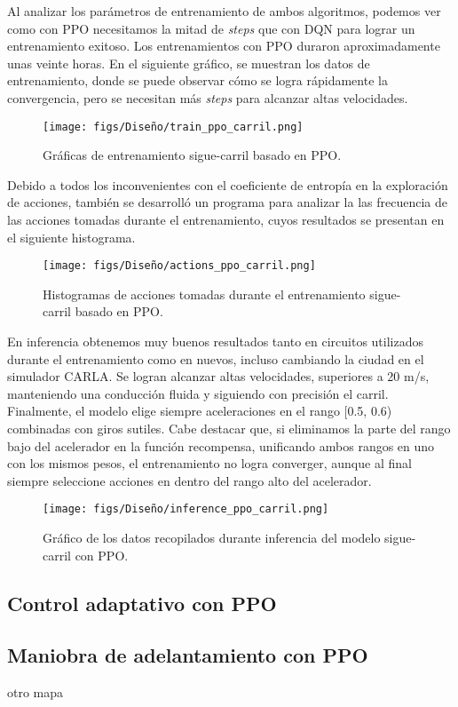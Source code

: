 Al analizar los parámetros de entrenamiento de ambos algoritmos, podemos ver como con \ac{PPO} necesitamos la mitad de \textit{steps} que con \ac{DQN} para lograr un entrenamiento exitoso. Los entrenamientos con \ac{PPO} duraron aproximadamente unas veinte horas. En el siguiente gráfico, se muestran los datos de entrenamiento, donde se puede observar cómo se logra rápidamente la convergencia, pero se necesitan más \textit{steps} para alcanzar altas velocidades.
\begin{figure}[ht]
  \centering
  \texttt{[image: figs/Diseño/train\_ppo\_carril.png]}
  \caption{Gráficas de entrenamiento sigue-carril basado en \ac{PPO}.}
  \label{fig:train_ppo_carril}
\end{figure}

Debido a todos los inconvenientes con el coeficiente de entropía en  la exploración de acciones, también se desarrolló un programa para analizar la las frecuencia de las acciones tomadas durante el entrenamiento, cuyos resultados se presentan en el siguiente histograma.
\begin{figure}[ht]
  \centering
  \texttt{[image: figs/Diseño/actions\_ppo\_carril.png]}
  \caption{Histogramas de acciones tomadas durante el entrenamiento sigue-carril basado en \ac{PPO}.}
  \label{fig:actions_ppo_carril}
\end{figure}

En inferencia obtenemos muy buenos resultados tanto en circuitos utilizados durante el entrenamiento como en nuevos, incluso cambiando la ciudad en el simulador CARLA. Se logran alcanzar altas velocidades, superiores a 20 m/s, manteniendo una conducción fluida y siguiendo con precisión el carril. Finalmente, el modelo elige siempre aceleraciones en el rango [0.5, 0.6) combinadas con giros sutiles. Cabe destacar que, si eliminamos la parte del rango bajo del acelerador en la función recompensa, unificando ambos rangos en uno con los mismos pesos, el entrenamiento no logra converger, aunque al final siempre seleccione acciones en dentro del rango alto del acelerador.
\begin{figure}[ht]
  \centering
  \texttt{[image: figs/Diseño/inference\_ppo\_carril.png]}
  \caption{Gráfico de los datos recopilados durante inferencia del modelo sigue-carril con \ac{PPO}.}
  \label{fig:inference_ppo_carril}
\end{figure}

\subsection{Control adaptativo con PPO}

\subsection{Maniobra de adelantamiento con PPO}

otro mapa